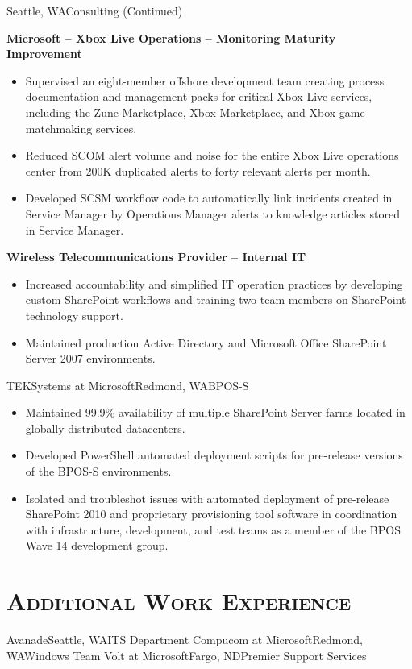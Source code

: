 \documentclass[11pt,letter,roman]{moderncv}
\begin{document}
{Seattle, WA}{Consulting (Continued)}{%
  \textbf{Microsoft -- Xbox Live Operations -- Monitoring Maturity Improvement}
  \begin{itemize}
    \item Supervised an eight-member offshore development team creating
      process documentation and management packs for critical Xbox Live
      services, including the Zune Marketplace, Xbox Marketplace, and Xbox
      game matchmaking services.
    \item Reduced SCOM alert volume and noise for the entire Xbox Live
      operations center from 200K duplicated alerts to forty relevant alerts
      per month.
    \item Developed SCSM workflow code to automatically link incidents created
      in Service Manager by Operations Manager alerts to knowledge articles
      stored in Service Manager.
  \end{itemize}
  \textbf{Wireless Telecommunications Provider -- Internal IT}
  \begin{itemize}
    \item Increased accountability and simplified IT operation practices by
      developing custom SharePoint workflows and training two team members
      on SharePoint technology support.
    \item Maintained production Active Directory and Microsoft Office
      SharePoint Server 2007 environments.
  \end{itemize}
}
{TEKSystems at Microsoft}{Redmond, WA}{BPOS-S}{%
  \begin{itemize}
    \item Maintained 99.9\% availability of multiple SharePoint Server farms
      located in globally distributed datacenters.
    \item Developed PowerShell automated deployment scripts for pre-release
      versions of the BPOS-S environments.
    \item Isolated and troubleshot issues with automated deployment of
      pre-release SharePoint 2010 and proprietary provisioning tool software
      in coordination with infrastructure, development, and test teams as a
      member of the BPOS Wave 14 development group.
  \end{itemize}
}

\section{\textsc{Additional Work Experience}}
{Avanade}{Seattle, WA}{ITS Department}{}
{Compucom at Microsoft}{Redmond, WA}{Windows Team}{}
{Volt at Microsoft}{Fargo, ND}{Premier Support Services}{}
\end{document}
